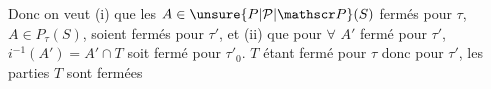 Donc on veut (i) que les $A\in\unsure{P|\mathcal P|\mathscr P}(S)$ fermés pour $\tau$,  $A\in P_\tau(S)$, soient fermés pour $\tau'$,  et (ii) que pour \uline{$\forall$} $A'$ fermé pour $\tau'$, $i^{-1}(A')=A'\cap T$ soit fermé pour $\tau'_0$.  $T$ étant fermé  pour $\tau$ donc pour $\tau'$, les parties    $T$  sont fermées
